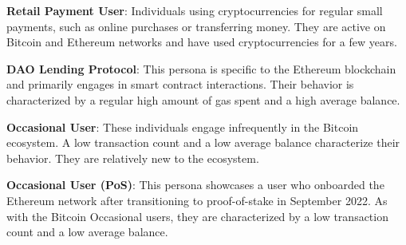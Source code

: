 \documentclass[11pt]{report}
\begin{document}
\textbf{Retail Payment User}: Individuals using cryptocurrencies for regular small payments, such as online purchases or transferring money. They are active on Bitcoin and Ethereum networks and have used cryptocurrencies for a few years.

\textbf{DAO Lending Protocol}: This persona is specific to the Ethereum blockchain and primarily engages in smart contract interactions. Their behavior is characterized by a regular high amount of gas spent and a high average balance.

\textbf{Occasional User}: These individuals engage infrequently in the Bitcoin ecosystem. A low transaction count and a low average balance characterize their behavior. They are relatively new to the ecosystem.

\textbf{Occasional User (PoS)}: This persona showcases a user who onboarded the Ethereum network after transitioning to proof-of-stake in September 2022. As with the Bitcoin Occasional users, they are characterized by a low transaction count and a low average balance.

\end{document}
